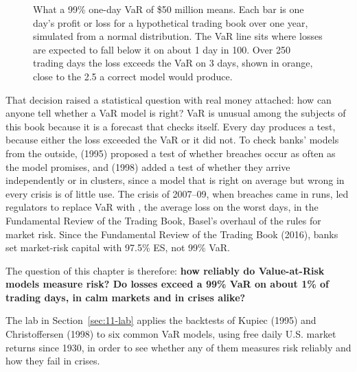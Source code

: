 \begin{figure}[htbp]
{%
}
\caption{What a 99\% one-day VaR of \$50 million means. Each bar is one day's profit or loss for a hypothetical trading book over one year, simulated from a normal distribution. The VaR line sits where losses are expected to fall below it on about 1 day in 100. Over 250 trading days the loss exceeds the VaR on 3 days, shown in orange, close to the 2.5 a correct model would produce.}
\label{fig:11-var-intro}
\end{figure}


That decision raised a statistical question with real money attached: how can anyone tell whether a VaR model is right? VaR is unusual among the subjects of this book because it is a forecast that checks itself. Every day produces a test, because either the loss exceeded the VaR or it did not. To check banks' models from the outside,  (1995) proposed a test of whether breaches occur as often as the model promises, and  (1998) added a test of whether they arrive independently or in clusters, since a model that is right on average but wrong in every crisis is of little use. The crisis of 2007--09, when breaches came in runs, led regulators to replace VaR with , the average loss on the worst days, in the Fundamental Review of the Trading Book, Basel's overhaul of the rules for market risk.
Since the Fundamental Review of the Trading Book (2016), banks set market-risk capital with 97.5\% ES, not 99\% VaR. 


The question of this chapter is therefore: \textbf{how reliably do Value-at-Risk models measure risk? Do losses exceed a 99\% VaR on about 1\% of trading days, in calm markets and in crises alike?}

The lab in Section~\ref{sec:11-lab} applies the backtests of Kupiec (1995) and Christoffersen (1998) to six common VaR models, using free daily U.S. market returns since 1930, in order to see whether any of them measures risk reliably and how they fail in crises.


